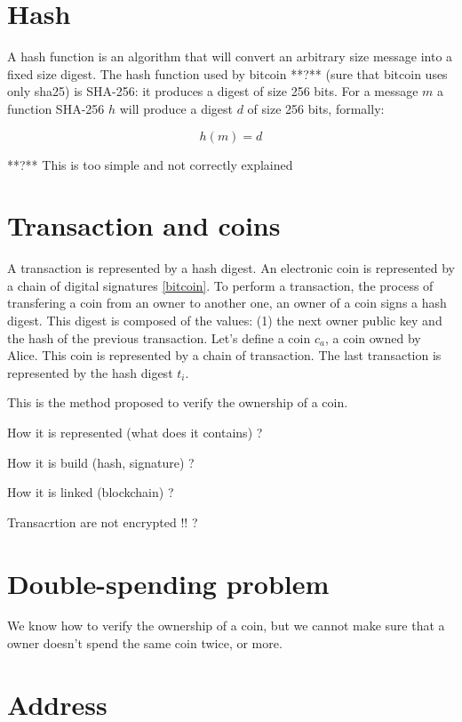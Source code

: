 \documentclass[letterpaper]{article}
\begin{document}
\section{Hash}

A hash function is an algorithm that will convert an arbitrary
size message into a fixed size digest. The hash function
used by bitcoin **?** (sure that
bitcoin uses only sha25) is SHA-256: it produces a digest of size 256 bits.
For a message $m$ a function SHA-256 $h$ will produce a digest $d$ of
size 256 bits, formally:

\begin{equation}
    h(m) = d
\end{equation}

**?** This is too simple and not correctly explained

\section{Transaction and coins}
A transaction is represented by a hash digest.
An electronic coin is represented by a
chain of digital signatures \ref{bitcoin}. To perform a transaction,
the process of transfering a coin from an owner to another one,
an owner of a coin signs a hash digest. This digest is composed of the
values: (1) the next owner public key and the hash of the previous transaction.
Let's define a coin $c_a$, a coin owned by Alice. This coin is represented
by a chain of transaction. The last transaction is represented
by the hash digest $t_i$.



This is the method proposed to verify the ownership of a coin.




How it is represented (what does it contains) ?


How it is build (hash, signature) ?

How it is linked (blockchain) ?

Transacrtion are not encrypted !! ?

\section{Double-spending problem}

We know how to verify the ownership of a coin, but we cannot make sure
that a owner doesn't spend the same coin twice, or more.




\section{Address}
\end{document}
